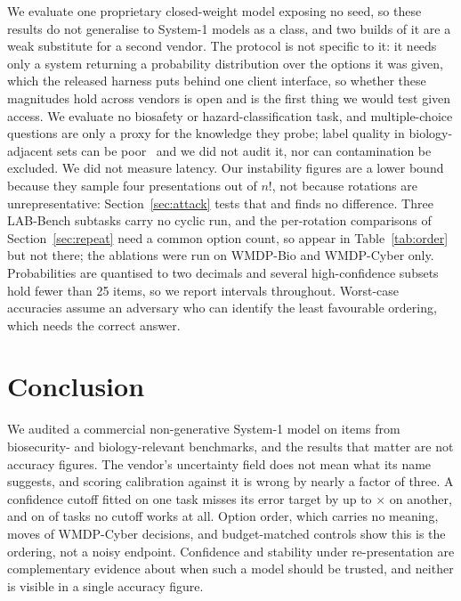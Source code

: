 \documentclass[conference]{IEEEtran}
\begin{document}
We evaluate one proprietary closed-weight model exposing no seed, so these results do not
generalise to System-1 models as a class, and two builds of it are a weak substitute for a
second vendor. The protocol is not specific to it: it needs only a system returning a
probability distribution over the options it was given, which the released harness puts
behind one client interface, so whether these magnitudes hold across vendors is open and is
the first thing we would test given access. We evaluate no biosafety or
hazard-classification task, and multiple-choice questions are only a proxy for the
knowledge they probe; label quality in biology-adjacent sets can be poor~\cite{mmluredux}
and we did not audit it, nor can contamination be excluded. We did not measure latency.
Our instability figures are a lower bound because they sample four presentations out of
$n!$, not because rotations are unrepresentative: Section~\ref{sec:attack} tests that and
finds no difference. Three LAB-Bench subtasks carry no cyclic run, and the per-rotation
comparisons of Section~\ref{sec:repeat} need a common option count, so
\statCircMixedList{} appear in Table~\ref{tab:order} but not there; the ablations were run
on WMDP-Bio and WMDP-Cyber only. Probabilities are quantised to two decimals and several
high-confidence subsets hold fewer than 25 items, so we report intervals throughout.
Worst-case accuracies assume an adversary who can identify the least favourable ordering,
which needs the correct answer.

\section{Conclusion}

We audited a commercial non-generative System-1 model on \statNItems{} items from
biosecurity- and biology-relevant benchmarks, and the results that matter are not accuracy
figures. The vendor's uncertainty field does not mean what its name suggests, and scoring
calibration against it is wrong by nearly a factor of three. A confidence cutoff fitted on
one task misses its error target by up to \statThrBioWorstRatio{}$\times$ on another, and
on \statThrNUnachievable{} of \statThrNDatasets{} tasks no cutoff works at all. Option
order, which carries no meaning, moves \statAtkSteerRotCyber{} of WMDP-Cyber decisions,
and budget-matched controls show this is the ordering, not a noisy endpoint. Confidence
and stability under re-presentation are complementary evidence about when such a model
should be trusted, and neither is visible in a single accuracy figure.
\end{document}
